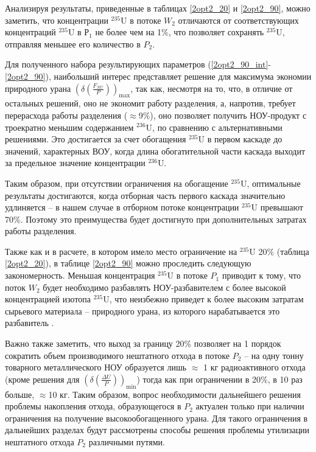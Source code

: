 Анализируя результаты, приведенные в таблицах \ref{2opt2_20} и \ref{2opt2_90}, можно заметить, что концентрации $^{235}$U в потоке $W_2$ отличаются от соответствующих концентраций $^{235}$U в $Р_1$ не более чем на 1\%, что позволяет сохранять $^{235}$U, отправляя меньшее его количество в $P_2$.

Для полученного набора результирующих параметров (\ref{2opt2_90_int}-\ref{2opt2_90}), наибольший интерес представляет решение для максимума экономии природного урана $(\delta(\frac{F_{NU}}{P}))_\text{max}$, так как, несмотря на то, что, в отличие от остальных решений, оно не экономит работу разделения, а, напротив, требует перерасхода работы разделения ($\approx$9\%), оно позволяет получить НОУ-продукт с троекратно меньшим содержанием $^{236}$U, по сравнению с альтернативными решениями. Это достигается за счет обогащения $^{235}$U в первом каскаде до значений, характерных ВОУ, когда длина обогатительной части каскада выходит за предельное значение концентрации $^{236}$U.

Таким образом, при отсутствии ограничения на обогащение $^{235}$U, оптимальные результаты достигаются, когда отборная часть первого каскада значительно удлиняется -- в нашем случае в отборном потоке концентрации $^{235}$U превышают 70\%. Поэтому это преимущества будет достигнуто при дополнительных затратах работы разделения.

Также как и в расчете, в котором имело место ограничение на $^{235}$U 20\% (таблица \ref{2opt2_20}), в таблице \ref{2opt2_90} можно проследить следующую закономерность. Меньшая концентрация $^{235}$U в потоке $P_{1}$ приводит к тому, что поток $W_{2}$ будет необходимо разбавлять НОУ-разбавителем с более высокой концентрацией изотопа $^{235}$U, что неизбежно приведет к более высоким затратам сырьевого материала -- природного урана, из которого нарабатывается это разбавитель .

Важно также заметить, что выход за границу 20\% позволяет на 1 порядок сократить объем производимого нештатного отхода в потоке $P_{2}$ -- на одну тонну товарного металлического НОУ образуется лишь $\approx$ 1 кг радиоактивного отхода (кроме решения для $(\delta(\frac{\Delta U}{P}))_\text{min}$) тогда как при ограничении в 20\%, в 10 раз больше, $\approx$10 кг. Таким образом, вопрос необходимости дальнейшего решения проблемы накопления отхода, образующегося в $P_{2}$ актуален только при наличии ограничения на получение высокообогащенного урана. Для такого ограничения в дальнейших разделах будут рассмотрены способы решения проблемы утилизации нештатного отхода $P_{2}$ различными путями. 






